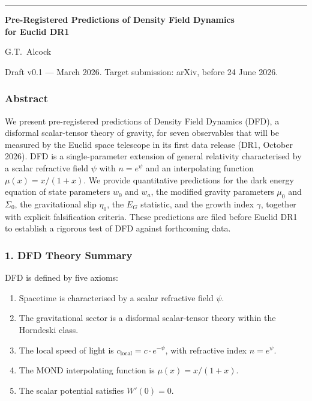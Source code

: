 \documentclass[11pt,a4paper]{article}
\begin{document}
\noindent\rule{\textwidth}{0.5pt}

\begin{center}
{\Large\textbf{Pre-Registered Predictions of Density Field Dynamics\\for Euclid DR1}}

\vspace{6pt}
{\large G.T.~Alcock}

\vspace{6pt}
{\small Draft v0.1 --- March 2026. Target submission: arXiv, before 24 June 2026.}
\end{center}

\subsubsection*{Abstract}

We present pre-registered predictions of Density Field Dynamics (DFD), a disformal scalar-tensor theory of gravity, for seven observables that will be measured by the Euclid space telescope in its first data release (DR1, October 2026). DFD is a single-parameter extension of general relativity characterised by a scalar refractive field $\psi$ with $n = e^\psi$ and an interpolating function $\mu(x) = x/(1+x)$. We provide quantitative predictions for the dark energy equation of state parameters $w_0$ and $w_a$, the modified gravity parameters $\mu_0$ and $\Sigma_0$, the gravitational slip $\eta_0$, the $E_G$ statistic, and the growth index $\gamma$, together with explicit falsification criteria. These predictions are filed before Euclid DR1 to establish a rigorous test of DFD against forthcoming data.

\subsubsection*{1. DFD Theory Summary}

DFD is defined by five axioms:
\begin{enumerate}
\item[A1.] Spacetime is characterised by a scalar refractive field $\psi$.
\item[A2.] The gravitational sector is a disformal scalar-tensor theory within the Horndeski class.
\item[A3.] The local speed of light is $c_\mathrm{local} = c \cdot e^{-\psi}$, with refractive index $n = e^\psi$.
\item[A4.] The MOND interpolating function is $\mu(x) = x/(1+x)$.
\item[A5.] The scalar potential satisfies $W'(0) = 0$.
\end{enumerate}
\end{document}
